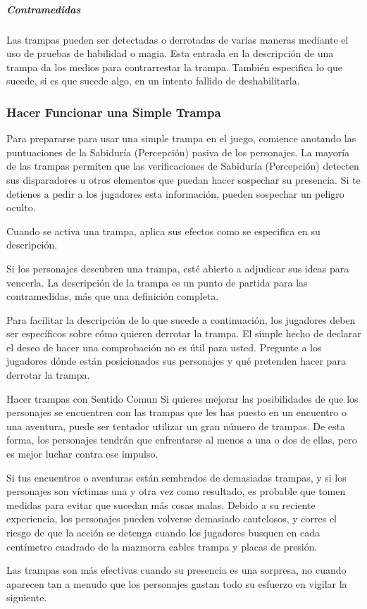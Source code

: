 \documentclass[a4paper,twocolumn,openany,10pt]{dndbook}
\begin{document}
\subparagraph{Contramedidas} Las trampas pueden ser detectadas o derrotadas de varias maneras mediante el uso de pruebas de
habilidad o magia. Esta entrada en la descripción de una trampa da los medios para contrarrestar la trampa. También especifica lo
que sucede, si es que sucede algo, en un intento fallido de deshabilitarla. 

\subsubsection{Hacer Funcionar una Simple Trampa}
Para prepararse para usar una simple trampa en el juego, comience anotando las puntuaciones de la Sabiduría (Percepción) pasiva
de los personajes. La mayoría de las trampas permiten que las verificaciones de Sabiduría (Percepción) detecten sus disparadores
u otros elementos que puedan hacer sospechar su presencia. Si te detienes a pedir a los jugadores esta información, pueden
sospechar un peligro oculto.

Cuando se activa una trampa, aplica sus efectos como se especifica en su descripción.

Si los personajes descubren una trampa, esté abierto a adjudicar sus ideas para vencerla. La descripción de la trampa es un punto
de partida para las contramedidas, más que una definición completa.

Para facilitar la descripción de lo que sucede a continuación, los jugadores deben ser específicos sobre cómo quieren derrotar la
trampa. El simple hecho de declarar el deseo de hacer una comprobación no es útil para usted. Pregunte a los jugadores dónde
están posicionados sus personajes y qué pretenden hacer para derrotar la trampa.

\begin{paperbox}[float=!b]{Hacer trampas con Sentido Comun}
	Si quieres mejorar las posibilidades de que los personajes se encuentren con las trampas que les has puesto en un encuentro o
	una aventura, puede ser tentador utilizar un gran número de trampas. De esta forma, los personajes tendrán que enfrentarse al
	menos a una o dos de ellas, pero es mejor luchar contra ese impulso.
	
	Si tus encuentros o aventuras están sembrados de demasiadas trampas, y si los personajes son víctimas una y otra vez como
	resultado, es probable que tomen medidas para evitar que sucedan más cosas malas. Debido a su reciente experiencia, los
	personajes pueden volverse demasiado cautelosos, y corres el riesgo de que la acción se detenga cuando los jugadores busquen
	en cada centímetro cuadrado de la mazmorra cables trampa y placas de presión.
	
	Las trampas son más efectivas cuando su presencia es una sorpresa, no cuando aparecen tan a menudo que los personajes gastan
	todo su esfuerzo en vigilar la siguiente.  
\end{paperbox}
\end{document}
